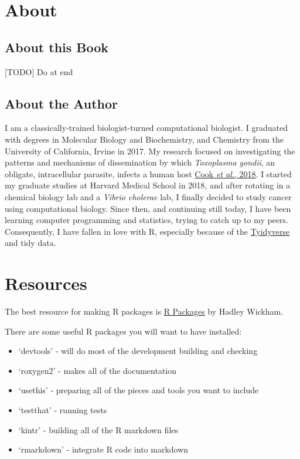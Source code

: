 \documentclass[]{book}
\providecommand{\tightlist}{%
  \setlength{\itemsep}{0pt}\setlength{\parskip}{0pt}}
\begin{document}
\hypertarget{about}{%
\section*{About}\label{about}}

\hypertarget{about-this-book}{%
\subsection*{About this Book}\label{about-this-book}}

{[}TODO{]} Do at end

\hypertarget{about-the-author}{%
\subsection*{About the Author}\label{about-the-author}}

I am a classically-trained biologist-turned computational biologist. I graduated with degrees in Molecular Biology and Biochemistry, and Chemistry from the University of California, Irvine in 2017. My research focused on investigating the patterns and mechanisms of dissemination by which \emph{Toxoplasma gondii}, an obligate, intracellular parasite, infects a human host \href{https://www.ncbi.nlm.nih.gov/pubmed/29295815}{Cook \emph{et al.}, 2018}. I started my graduate studies at Harvard Medical School in 2018, and after rotating in a chemical biology lab and a \emph{Vibrio cholerae} lab, I finally decided to study cancer using computational biology. Since then, and continuing still today, I have been learning computer programming and statistics, trying to catch up to my peers. Consequently, I have fallen in love with R, especially because of the \href{https://www.tidyverse.org}{Tyidyverse} and tidy data.

\hypertarget{resources}{%
\section*{Resources}\label{resources}}

The best resource for making R packages is \href{https://r-pkgs.org/index.html}{R Packages} by Hadley Wickham.

There are some useful R packages you will want to have installed:

\begin{itemize}
\tightlist
\item
  `devtools' - will do most of the development building and checking
\item
  `roxygen2' - makes all of the documentation
\item
  `usethis' - preparing all of the pieces and tools you want to include
\item
  `testthat' - running tests
\item
  `kintr' - building all of the R markdown files
\item
  `rmarkdown' - integrate R code into markdown
\end{itemize}
\end{document}
